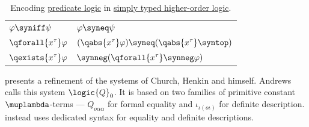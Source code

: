 \begin{remark}
\begin{table}
\begin{center}
\begin{tabular}{l l}
        \( \varphi \syniff \psi \)       & \( \varphi \syneq \psi \)                                                                                                                                                                                \\
        \( \qforall {x^\tau} \varphi \)  & \( (\qabs {x^\tau} \varphi) \syneq (\qabs {x^\tau} \syntop) \)                                                                                                                                           \\
        \( \qexists {x^\tau} \varphi \)  & \( \synneg (\qforall {x^\tau} \synneg \varphi) \)                                                                                                                                                        \\
        \bottomrule
      \end{tabular}
    \end{center}

    \caption{Encoding \hyperref[con:predicate_logic]{predicate logic} in \hyperref[def:higher_order_logic]{simply typed higher-order logic}.}\label{tab:rem:hol_formula_abbreviations}
  \end{table}

  \Textcite[\S 51]{Andrews2002Logic} presents a refinement of the systems of Church, Henkin and himself. Andrews calls this system \( \logic{Q}_0 \). It is based on two families of primitive constant \( \muplambda \)-terms --- \( Q_{o \alpha \alpha} \) for formal equality and \( \iota_{\iota (o \iota)} \) for definite description. \Textcite{Farmer2008STTVirtues} instead uses dedicated syntax for equality and definite descriptions.
\end{remark}

